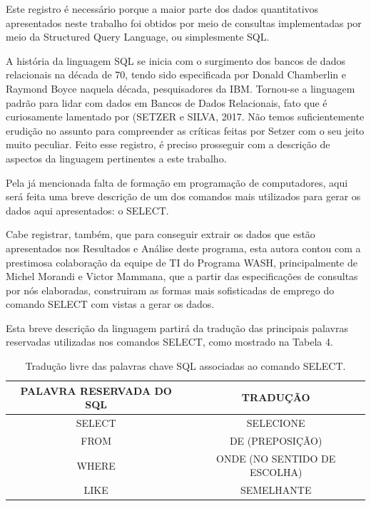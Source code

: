 Este registro é necessário porque a maior parte dos dados quantitativos apresentados neste trabalho foi obtidos por meio de consultas implementadas por meio da Structured Query Language, ou simplesmente SQL.

A história da linguagem SQL se inicia com o surgimento dos bancos de dados relacionais na década de 70, tendo sido  especificada por Donald Chamberlin e Raymond Boyce naquela década, pesquisadores da IBM. Tornou-se a linguagem padrão para lidar com dados em Bancos de Dados Relacionais, fato que é curiosamente lamentado por (SETZER e SILVA, 2017. Não temos suficientemente erudição no assunto para compreender as críticas feitas por Setzer com o seu jeito muito peculiar. Feito esse registro, é preciso prosseguir com a descrição de aspectos da linguagem pertinentes a este trabalho.

Pela já mencionada falta de formação em programação de computadores, aqui será feita uma breve descrição de um dos comandos mais utilizados para gerar os dados aqui apresentados: o SELECT.

Cabe registrar, também, que para conseguir extrair os dados que estão apresentados nos Resultados e Análise deste programa, esta autora contou com a prestimosa colaboração da equipe de TI do Programa WASH, principalmente de Michel Morandi e Victor Mammana, que a partir das especificações de consultas por nós elaboradas, construiram as formas mais sofisticadas de emprego do comando SELECT com vistas a gerar os dados.

Esta breve descrição da linguagem partirá da tradução das principais palavras reservadas utilizadas nos comandos SELECT, como mostrado na Tabela 4.





\begin{table}[htb]
\tiny
\caption{\label{0ecfe7d399cde9f090a28714d49de055551507ec}Tradução livre das palavras chave SQL associadas ao comando SELECT.}

\centering
\begin{tabular}{|c|c|}
\hline
PALAVRA RESERVADA DO SQL  &  TRADUÇÃO \\
\hline
SELECT  &  SELECIONE \\
FROM  &  DE (PREPOSIÇÃO) \\
WHERE  &  ONDE (NO SENTIDO DE ESCOLHA) \\
LIKE  &  SEMELHANTE \\
\hline
\end{tabular}
\end{table}


